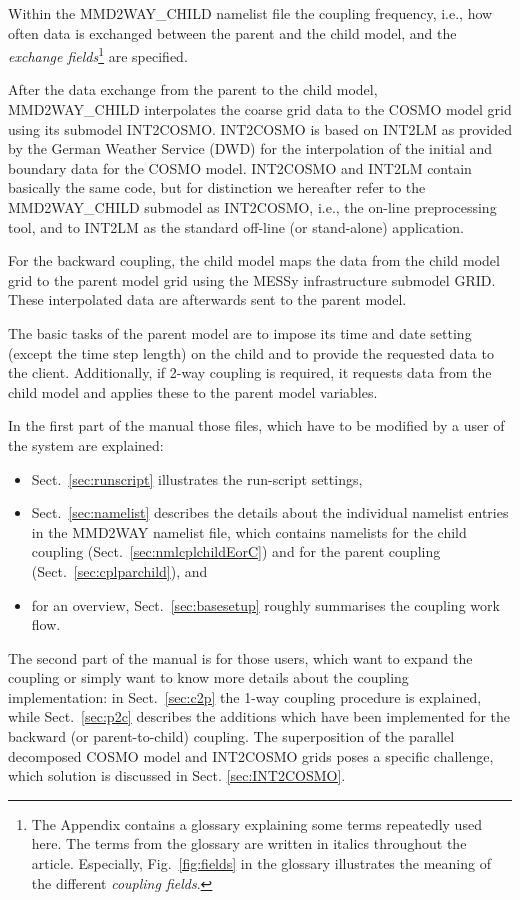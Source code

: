 \documentclass[11pt,twoside]{article}
\begin{document}
 Within the MMD2WAY\_CHILD namelist
file the coupling frequency, i.e., how often data is exchanged between the
parent and the child model, and the {\it exchange fields}\footnote{The
Appendix contains a glossary explaining some terms repeatedly used here.
The terms from the glossary are written in italics throughout the
article. Especially, Fig.\ \ref{fig:fields} in the glossary
illustrates the meaning of the different {\it coupling fields}.}
are specified. 

After the data exchange from the parent to the child model, MMD2WAY\_CHILD
interpolates the coarse grid data to the COSMO model  
grid using its submodel INT2COSMO. INT2COSMO is based on INT2LM as provided
by the German Weather Service (DWD) for the interpolation of the initial and
boundary data for the COSMO model. 
INT2COSMO and INT2LM contain basically the same code, but for distinction we
hereafter refer to the MMD2WAY\_CHILD submodel as INT2COSMO, i.e., the on-line 
preprocessing tool, and to INT2LM as the standard off-line (or stand-alone)
application. 

For the backward coupling, the child model maps the data from the
child model grid to the 
parent model grid using the MESSy infrastructure submodel GRID.
These interpolated data are afterwards sent to the parent model.

The basic tasks of the parent model are to impose its time and date
setting (except the 
time step length) on the child and to provide the requested data to the client.
Additionally, if 2-way coupling is required, it requests data from the child
model and applies these to the parent model variables.

In the first part of the manual those files, which have
to be modified by a user of the system are explained:
\begin{itemize}
\item  Sect.\
\ref{sec:runscript} illustrates the run-script settings, 
\item Sect.\ \ref{sec:namelist}
describes the details about the individual namelist entries in the MMD2WAY  namelist
file, which contains namelists for the child coupling
(Sect.\ \ref{sec:nmlcplchildEorC}) and for the parent coupling
(Sect.\ \ref{sec:cplparchild}), and
\item for an overview, Sect.\ \ref{sec:basesetup} roughly summarises the  
coupling work flow.
\end{itemize}

The second part of the manual is for those users, which want to 
expand the coupling or simply want to know more details about the coupling
implementation: in Sect.\ \ref{sec:c2p} the 1-way coupling procedure
is explained, while Sect.\ \ref{sec:p2c} describes the additions which
have been implemented for the backward (or parent-to-child) coupling.
The superposition of the parallel decomposed COSMO model and INT2COSMO
grids poses a specific challenge, which solution is discussed in Sect. 
 \ref{sec:INT2COSMO}.
\end{document}
